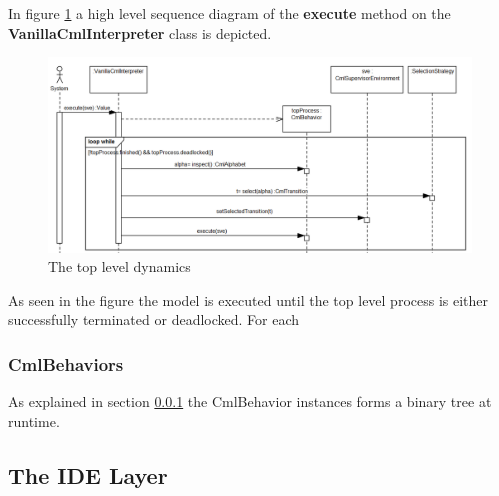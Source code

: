 \documentclass[a4paper, 10pt]{include/compassreport}   %
\begin{document}
In figure \ref{fig:dynamic_toplevel} a high level sequence diagram of
the \textbf{execute} method on the \textbf{VanillaCmlInterpreter}
class is depicted.

\begin{figure}[ht!]
  \begin{center}
    \includegraphics[width=1\textwidth]{figures/DynamicTopLevel}
    \caption{The top level dynamics}
    \label{fig:dynamic_toplevel}
  \end{center}
\end{figure}

As seen in the figure the model is executed until the top level
process is either successfully terminated or deadlocked. For each

\subsubsection{CmlBehaviors}

As explained in section \ref{} the CmlBehavior instances forms a binary tree at runtime.


\subsection{The IDE Layer}
\label{sec:user_interface}

\newpage


\label{ch:bib} %
\end{document}
